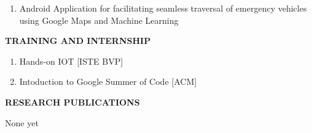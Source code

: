 \documentclass[10pt]{article}
\begin{document}
\begin{minipage}{0.95\textwidth}
{{\begin{enumerate}
\color{black} \item Android Application for facilitating seamless traversal of emergency vehicles using Google Maps and Machine Learning\\




\end{enumerate}
}}
\vspace{2mm}
\end{minipage}


\begin{minipage}{0.95\textwidth}
\vspace{5mm}
\begin{huge}
\textbf{\color{theme}TRAINING AND INTERNSHIP}
\end{huge}
\begin{mdframed}[backgroundcolor=theme]
\end{mdframed}

\vspace{1mm}

\color{black}\normalsize{{
\begin{enumerate}
\item Hands-on IOT [ISTE BVP]\\
\item Intoduction to Google Summer of Code [ACM]
\end{enumerate}
}}
\vspace{2mm}
\end{minipage}


\begin{minipage}{0.95\textwidth}
\vspace{5mm}
\begin{huge}
\textbf{\color{theme}RESEARCH PUBLICATIONS}
\end{huge}
\begin{mdframed}[backgroundcolor=theme]
\end{mdframed}

\vspace{1mm}

\color{black}\normalsize{{
None yet

}}
\end{minipage}

\vspace{5mm}
\end{document}
